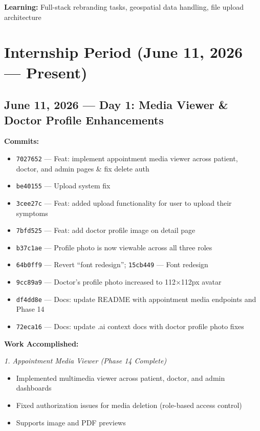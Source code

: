 \documentclass[11pt,a4paper]{article}
\begin{document}
\textbf{Learning:} Full-stack rebranding tasks, geospatial data handling, file upload
architecture

\newpage

\section{Internship Period (June 11, 2026 — Present)}

\subsection{June 11, 2026 — Day 1: Media Viewer \& Doctor Profile Enhancements}

\textbf{Commits:}
\begin{itemize}
  \item \texttt{7027652} — Feat: implement appointment media viewer across patient, doctor, and
        admin pages \& fix delete auth
  \item \texttt{be40155} — Upload system fix
  \item \texttt{3cee27c} — Feat: added upload functionality for user to upload their symptoms
  \item \texttt{7bfd525} — Feat: add doctor profile image on detail page
  \item \texttt{b37c1ae} — Profile photo is now viewable across all three roles
  \item \texttt{64b0ff9} — Revert ``font redesign''; \texttt{15cb449} — Font redesign
  \item \texttt{9cc89a9} — Doctor's profile photo increased to 112$\times$112px avatar
  \item \texttt{df4dd8e} — Docs: update README with appointment media endpoints and Phase 14
  \item \texttt{72eca16} — Docs: update .ai context docs with doctor profile photo fixes
\end{itemize}

\textbf{Work Accomplished:}

\textit{1. Appointment Media Viewer (Phase 14 Complete)}
\begin{itemize}
  \item Implemented multimedia viewer across patient, doctor, and admin dashboards
  \item Fixed authorization issues for media deletion (role-based access control)
  \item Supports image and PDF previews
\end{itemize}
\end{document}
